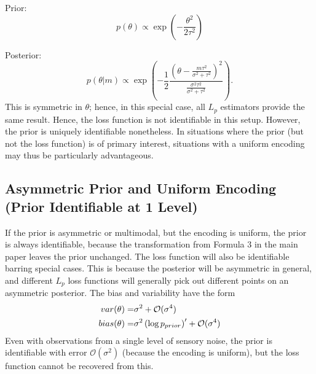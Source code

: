 Prior:
\begin{equation}
    p(\theta) \propto \exp(-\frac{\theta^2}{2\tau^2})
\end{equation}

Posterior:
\begin{equation}
p(\theta|m) \propto \exp\left(-\frac{1}{2} \frac{\left(\theta - \frac{m\tau^2}{\sigma^2 + \tau^2}\right)^2}{\frac{\sigma^2 \tau^2}{\sigma^2 + \tau^2}}\right).
\end{equation}
This is symmetric in $\theta$; hence, in this special case, all $L_p$ estimators provide the same result.
Hence, the loss function is not identifiable in this setup.
However, the prior is uniquely identifiable nonetheless.
In situations where the prior (but not the loss function) is of primary interest, situations with  a uniform encoding may thus be particularly advantageous.

\subsection{Asymmetric Prior and Uniform Encoding (Prior Identifiable at 1 Level)}

If the prior is asymmetric or multimodal, but the encoding is uniform, the prior is always identifiable, because the transformation from Formula 3 in the main paper leaves the prior unchanged. The loss function will also be identifiable barring special cases.
This is because the posterior will be asymmetric in general, and different $L_p$ loss functions will generally pick out different points on an asymmetric posterior.
The bias and variability have the form
\begin{align*}
    var(\theta) =& \sigma^2 + \mathcal{O}(\sigma^4) \\
    bias(\theta) =& \sigma^2 \left(\log p_{prior}\right)' + \mathcal{O}(\sigma^4)
\end{align*}
Even with observations from a single level of sensory noise, the prior is identifiable with error $\mathcal{O}(\sigma^2)$ (because the encoding is uniform), but the loss function cannot be recovered from this.

